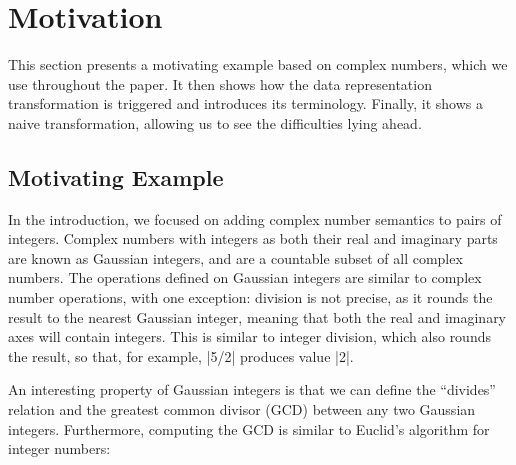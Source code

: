 \section{Motivation}
\label{sec:problem}

This section presents a motivating example based on complex numbers, which we use throughout the paper. It then shows how the data representation transformation is triggered and introduces its terminology. Finally, it shows a naive transformation, allowing us to see the difficulties lying ahead.

\subsection{Motivating Example}

In the introduction, we focused on adding complex number semantics to
pairs of integers. Complex numbers with integers as both their real
and imaginary parts are known as Gaussian integers, and are a
countable subset of all complex numbers. The operations defined on
Gaussian integers are similar to complex number operations, with one
exception: division is not precise, as it rounds the result to the
nearest Gaussian integer, meaning that both the real and imaginary
axes will contain integers. This is similar to integer division, which
also rounds the result, so that, for example, |5/2| produces value
|2|.


An interesting property of Gaussian integers is that we can define the
``divides'' relation and the greatest common divisor (GCD) between any
two Gaussian integers. Furthermore, computing the GCD is similar to
Euclid's algorithm for integer numbers:

